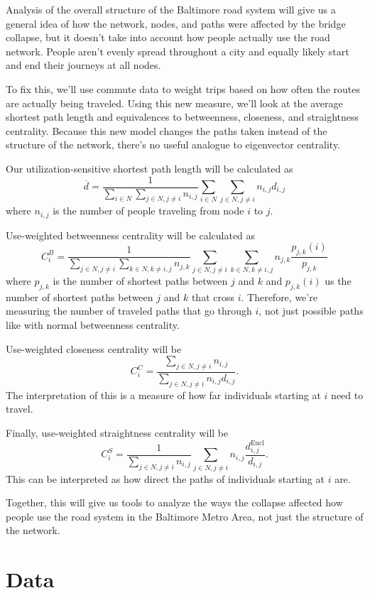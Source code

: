 \documentclass[11pt]{article}
\numberwithin{equation}{section} %
\numberwithin{figure}{section} %
\numberwithin{table}{section} %
\theoremstyle{definition}
\begin{document}
Analysis of the overall structure of the Baltimore road system will give us a general idea of how the network, nodes, and paths were affected by the bridge collapse, but it doesn't take into account how people actually use the road network. People aren't evenly spread throughout a city and equally likely start and end their journeys at all nodes.

To fix this, we'll use commute data to weight trips based on how often the routes are actually being traveled. Using this new measure, we'll look at the average shortest path length and equivalences to betweenness, closeness, and straightness centrality. Because this new model changes the paths taken instead of the structure of the network, there's no useful analogue to eigenvector centrality.

Our utilization-sensitive shortest path length will be calculated as
\[
  \overline{d} = \frac{1}{\sum_{i \in N} \sum_{j \in N, j \neq i} n_{i, j}} \sum_{i \in N} \sum_{j \in N, j \neq i} n_{i, j} d_{i, j}
\]
where $n_{i, j}$ is the number of people traveling from node $i$ to $j$.

Use-weighted betweenness centrality will be calculated as
\[
  C_i^B = \frac{1}{\sum_{j \in N, j \neq i} \sum_{k \in N, k \neq i, j} n_{j, k}} \sum_{j \in N, j \neq i} \sum_{k \in N, k \neq i, j} n_{j, k} \frac{p_{j, k} (i)}{p_{j, k}}
\]
where $p_{j, k}$ is the number of shortest paths between $j$ and $k$ and $p_{j, k} (i)$ us the number of shortest paths between $j$ and $k$ that cross $i$. Therefore, we're measuring the number of traveled paths that go through $i$, not just possible paths like with normal betweenness centrality.

Use-weighted closeness centrality will be
\[
  C_i^C = \frac{\sum_{j \in N, j \neq i} n_{i, j}}{\sum_{j \in N, j \neq i} n_{i, j} d_{i, j}}.
\]
The interpretation of this is a measure of how far individuals starting at $i$ need to travel.

Finally, use-weighted straightness centrality will be
\[
  C_i^S = \frac{1}{\sum_{j \in N, j \neq i} n_{i, j}} \sum_{j \in N, j \neq i} n_{i, j} \frac{d_{i, j}^\text{Eucl}}{d_{i, j}}.
\]
This can be interpreted as how direct the paths of individuals starting at $i$ are.

Together, this will give us tools to analyze the ways the collapse affected how people use the road system in the Baltimore Metro Area, not just the structure of the network.


\section{Data} \label{sec:data}
\end{document}
